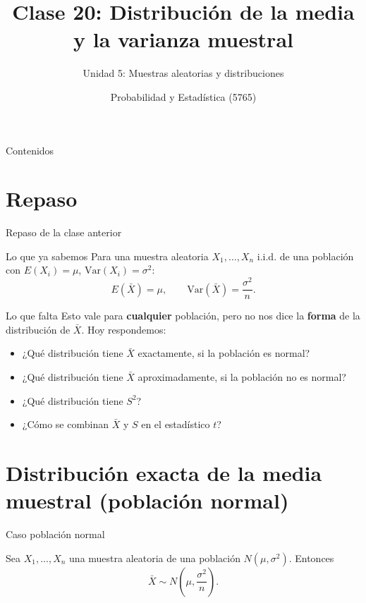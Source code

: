 \documentclass[aspectratio=169,11pt]{beamer}
\title[Prob. y Estadística]{Clase 20: Distribución de la media y la varianza muestral}
\subtitle{Unidad 5: Muestras aleatorias y distribuciones}
\institute[UNS]{Universidad Nacional del Sur \\ Departamento de Matemática}
\author{Probabilidad y Estadística (5765)}
\date{}
\begin{document}
\begin{frame}
\titlepage
\end{frame}

\begin{frame}{Contenidos}
\tableofcontents
\end{frame}

\section{Repaso}

\begin{frame}{Repaso de la clase anterior}
\begin{block}{Lo que ya sabemos}
Para una muestra aleatoria $X_1,\dots,X_n$ i.i.d. de una población con $E(X_i)=\mu$, $\text{Var}(X_i)=\sigma^2$:
$$E(\bar X) = \mu, \qquad \text{Var}(\bar X) = \frac{\sigma^2}{n}.$$
\end{block}

\begin{alertblock}{Lo que falta}
Esto vale para \textbf{cualquier} población, pero no nos dice la \textbf{forma} de la distribución de $\bar X$. Hoy respondemos:
\begin{itemize}
\item ¿Qué distribución tiene $\bar X$ exactamente, si la población es normal?
\item ¿Qué distribución tiene $\bar X$ aproximadamente, si la población no es normal?
\item ¿Qué distribución tiene $S^2$?
\item ¿Cómo se combinan $\bar X$ y $S$ en el estadístico $t$?
\end{itemize}
\end{alertblock}
\end{frame}

\section{Distribución exacta de la media muestral (población normal)}

\begin{frame}{Caso población normal}
\begin{theorem}
Sea $X_1,\dots,X_n$ una muestra aleatoria de una población $N(\mu,\sigma^2)$. Entonces
$$\bar X \sim N\left(\mu, \frac{\sigma^2}{n}\right).$$
\end{theorem}

\end{frame}
\end{document}
